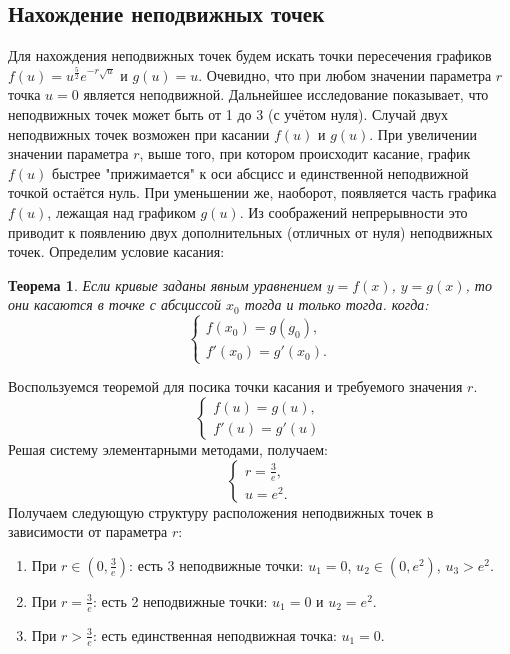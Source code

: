 \documentclass[12pt]{article}
\newtheorem{theorem}{Теорема}
\begin{document}
\subsection{Нахождение неподвижных точек}
Для нахождения неподвижных точек будем искать точки пересечения графиков $f(u) = u^{\frac{5}{2}}e^{-r\sqrt{u}}$ и $g(u) = u$.
Очевидно, что при любом значении параметра $r$ точка $u = 0$ является неподвижной. Дальнейшее исследование показывает, что неподвижных точек может быть от 1 до 3 (с учётом нуля). Случай двух неподвижных точек возможен при касании $f(u)$ и $g(u)$. При увеличении значении параметра $r$, выше того, при котором происходит касание, график $f(u)$ быстрее "прижимается" к оси абсцисс и единственной неподвижной точкой остаётся нуль. При уменьшении же, наоборот, появляется часть графика $f(u)$, лежащая над графиком $g(u)$. Из соображений непрерывности это приводит к появлению двух дополнительных (отличных от нуля) неподвижных точек. Определим условие касания:
\begin{theorem}
    Если кривые заданы явным уравнением $y = f(x)$, $y = g(x)$, то они касаются в точке с абсциссой $x_0$ тогда и только тогда. когда:
    \begin{equation}
        \begin{cases}
            f(x_0) = g(g_0),\\
            f'(x_0) = g'(x_0).
        \end{cases}
    \end{equation}
\end{theorem}
Воспользуемся теоремой для посика точки касания и требуемого значения $r$.
\begin{equation}
    \begin{cases}
        f(u) = g(u),\\
        f'(u) = g'(u)
    \end{cases}
\end{equation}
Решая систему элементарными методами, получаем:
\begin{equation}
    \begin{cases}
        r = \frac{3}{e},\\
        u = e^2.
    \end{cases}
\end{equation}
Получаем следующую структуру расположения неподвижных точек в зависимости от параметра $r$:
\begin{enumerate}
    \item При $r \in \left(0, \frac{3}{e}\right)$: есть 3 неподвижные точки: $u_1 = 0$, $u_2 \in (0, e^2)$, $u_3 > e^2$.
    \item При $r = \frac{3}{e}$: есть 2 неподвижные точки: $u_1 = 0$ и $u_2 = e^2$.
    \item При $r > \frac{3}{e}$: есть единственная неподвижная точка: $u_1 = 0$.
\end{enumerate}
\end{document}
